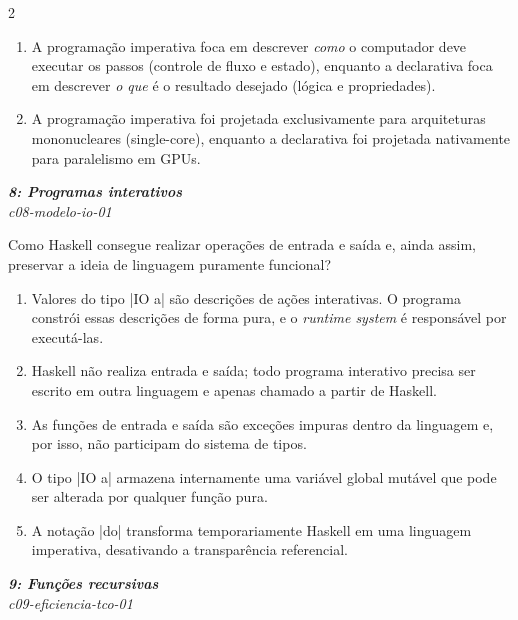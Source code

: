 \documentclass[a4paper,10pt,brazil]{article}
\begin{document}
\begin{multicols}{2}
\begin{enumerate}
  \item A programação imperativa foca em descrever \emph{como} o computador deve executar os passos (controle de fluxo e estado), enquanto a declarativa foca em descrever \emph{o que} é o resultado desejado (lógica e propriedades).

  \item A programação imperativa foi projetada exclusivamente para arquiteturas mononucleares (single-core), enquanto a declarativa foi projetada nativamente para paralelismo em GPUs.


\end{enumerate}

\begin{flushright}
  \footnotesize
  \textit{\textbf{8: Programas interativos}}\\
  \textit{c08-modelo-io-01}\\

\end{flushright}
Como Haskell consegue realizar operações de entrada e saída e, ainda assim, preservar a ideia de linguagem puramente funcional?

\begin{enumerate}
  \item Valores do tipo \haskellinline|IO a| são descrições de ações interativas. O programa constrói essas descrições de forma pura, e o \emph{runtime system} é responsável por executá-las.

  \item Haskell não realiza entrada e saída; todo programa interativo precisa ser escrito em outra linguagem e apenas chamado a partir de Haskell.

  \item As funções de entrada e saída são exceções impuras dentro da linguagem e, por isso, não participam do sistema de tipos.

  \item O tipo \haskellinline|IO a| armazena internamente uma variável global mutável que pode ser alterada por qualquer função pura.

  \item A notação \haskellinline|do| transforma temporariamente Haskell em uma linguagem imperativa, desativando a transparência referencial.


\end{enumerate}

\begin{flushright}
  \footnotesize
  \textit{\textbf{9: Funções recursivas}}\\
  \textit{c09-eficiencia-tco-01}\\


\end{flushright}
\end{multicols}
\end{document}
